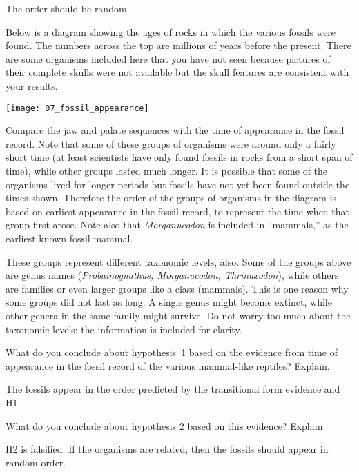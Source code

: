 \documentclass[12pt, hidelinks]{exam}
\newcommand*\AnswerBox[2]{%
    \parbox[t][#1]{0.92\textwidth}{%
    \begin{solution}#2\end{solution}}
}
\begin{document}
\begin{questions}
\AnswerBox{1\baselineskip}{The order should be random.}
\newpage

Below is a diagram showing the ages of rocks in which the various
fossils were found. The numbers across the top are millions of
years before the present. There are some organisms included here that you
have not seen because pictures of their complete skulls were not available 
but the skull features are consistent with your results.

\begin{center}
\texttt{[image: 07\_fossil\_appearance]}
\end{center}

Compare the jaw and palate sequences with the time of appearance in the
fossil record. Note that some of these groups of organisms were around
only a fairly short time (at least scientists have only found fossils in rocks
from a short span of time), while other groups lasted much longer. It is possible
that some of the organisms lived for longer periods but fossils have not yet been
found outside the times shown. Therefore the order of the groups of organisms in the diagram is based on earliest
appearance in the fossil record, to represent the time when that
group first arose. Note also that \textit{Morganucodon} is included
in ``mammals,'' as the earliest known
fossil mammal.

These groups represent different taxonomic levels, also. Some of the
groups above are genus names (\emph{Probainognathus, Morganucodon,
Thrinaxodon}), while others are families or even larger groups like a class 
(mammals). This is one reason why some groups did not last as
long. A single genus might become extinct, while other genera in the
same family might survive. Do not worry too much about the taxonomic
levels; the information is included for clarity.

\question
What do you conclude about hypothesis~1 based on the
evidence from time of appearance in the fossil record of the various
mammal-like reptiles? Explain. 

\AnswerBox{4\baselineskip}{%
The fossils appear in the order predicted by the transitional form evidence and H1.
}

\question
What do you conclude about hypothesis 2 based on this
evidence? Explain.

\AnswerBox{2\baselineskip}{%
H2 is falsified. If the organisms are related, then the fossils should appear in random order.
}

\end{questions}
\end{document}
